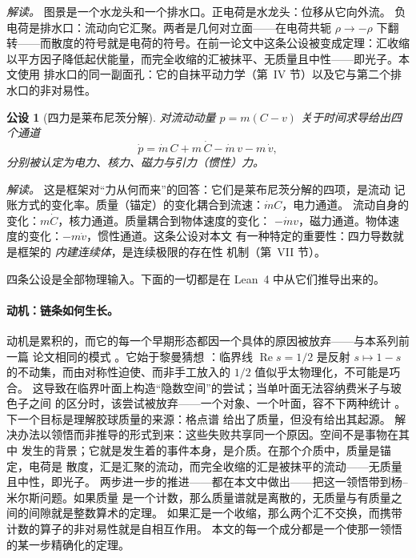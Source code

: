 \documentclass[aps,prd,preprint,superscriptaddress,amsmath,amssymb]{revtex4-2}
\newtheorem{postulate}{公设}[section]
\begin{document}
\emph{解读。} 图景是一个水龙头和一个排水口。正电荷是水龙头：位移从它向外流。
负电荷是排水口：流动向它汇聚。两者是几何对立面——在电荷共轭 $\rho\to-\rho$
下翻转——而散度的符号就是电荷的符号。在前一论文中这条公设被变成定理：汇收缩
以平方因子降低起伏能量，而完全收缩的汇被抹平、无质量且中性——即光子。本文使用
排水口的同一副面孔：它的自抹平动力学（第~IV 节）以及它与第二个排水口的非对易性。

\begin{postulate}[四力是莱布尼茨分解]
\label{post:forces}
对流动动量 $p=m(C-v)$ 关于时间求导给出四个通道
\begin{equation}
\dot p = \dot m\,C + m\,\dot C - \dot m\,v - m\,\dot v,
\label{eq:fourforce}
\end{equation}
分别被认定为电力、核力、磁力与引力（惯性）力。
\end{postulate}

\emph{解读。} 这是框架对``力从何而来''的回答：它们是莱布尼茨分解的四项，是流动
记账方式的变化率。质量（锚定）的变化耦合到流速：$\dot m C$，电力通道。
流动自身的变化：$m\dot C$，核力通道。质量耦合到物体速度的变化：
$-\dot m v$，磁力通道。物体速度的变化：$-m\dot v$，惯性通道。这条公设对本文
有一种特定的重要性：四力导数就是框架的 \emph{内建连续体}，是连续极限的存在性
机制（第~VII 节）。

四条公设是全部物理输入。下面的一切都是在 Lean~4 中从它们推导出来的。

\paragraph{动机：链条如何生长。}
动机是累积的，而它的每一个早期形态都因一个具体的原因被放弃——与本系列前一篇
论文相同的模式 \cite{ProjectionPhysics,HibsPhysics}。它始于黎曼猜想
\cite{riemann1859ueber}：临界线 $\operatorname{Re}s=1/2$ 是反射 $s\mapsto 1-s$
的不动集，而由对称性迫使、而非手工放入的 $1/2$ 值似乎太物理化，不可能是巧合。
这导致在临界叶面上构造``隐数空间''的尝试；当单叶面无法容纳费米子与玻色子之间
的区分时，该尝试被放弃——一个对象、一个叶面，容不下两种统计 \cite{RiemannHIBS}。
下一个目标是理解胶球质量的来源：格点谱
\cite{morningstar1999glueball,chen2006glueball} 给出了质量，但没有给出其起源。
解决办法以领悟而非推导的形式到来：这些失败共享同一个原因。空间不是事物在其中
发生的背景；它就是发生着的事件本身，是介质。在那个介质中，质量是锚定，电荷是
散度，汇是汇聚的流动，而完全收缩的汇是被抹平的流动——无质量且中性，即光子。
两步进一步的推进——都在本文中做出——把这一领悟带到杨--米尔斯问题。如果质量
是一个计数，那么质量谱就是离散的，无质量与有质量之间的间隙就是整数算术的定理。
如果汇是一个收缩，那么两个汇不交换，而携带计数的算子的非对易性就是自相互作用。
本文的每一个成分都是一个使那一领悟的某一步精确化的定理。
\end{document}
